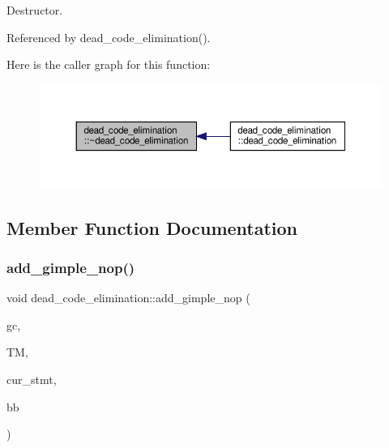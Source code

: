 Destructor. 



Referenced by dead\+\_\+code\+\_\+elimination().

Here is the caller graph for this function\+:
\nopagebreak
\begin{figure}[H]
\begin{center}
\leavevmode
\includegraphics[width=350pt]{d5/d8b/classdead__code__elimination_a64de8aa43bbf0badd72b23697a90c16d_icgraph}
\end{center}
\end{figure}


\subsection{Member Function Documentation}
\mbox{\label{classdead__code__elimination_aa17a85671486094c9539adb9dc3a9739}} 
\subsubsection{\texorpdfstring{add\+\_\+gimple\+\_\+nop()}{add\_gimple\_nop()}}
{\footnotesize\ttfamily void dead\+\_\+code\+\_\+elimination\+::add\+\_\+gimple\+\_\+nop (\begin{DoxyParamCaption}\item[{\hyperlink{structgimple__node}{gimple\+\_\+node} $\ast$}]{gc,  }\item[{const \hyperlink{tree__manager_8hpp_a96ff150c071ce11a9a7a1e40590f205e}{tree\+\_\+manager\+Ref}}]{TM,  }\item[{\hyperlink{tree__node_8hpp_a6ee377554d1c4871ad66a337eaa67fd5}{tree\+\_\+node\+Ref}}]{cur\+\_\+stmt,  }\item[{bloc\+Ref}]{bb }\end{DoxyParamCaption})\hspace{0.3cm}{\ttfamily [private]}}



